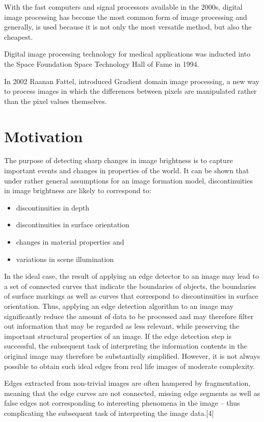 \documentclass[BTech]{srmuthesis}
\begin{document}
With the fast computers and signal processors available in the 2000s, digital image processing has become the most common form of image processing and generally, is used because it is not only the most versatile method, but also the cheapest.

Digital image processing technology for medical applications was inducted into the Space Foundation Space Technology Hall of Fame in 1994.

In 2002 Raanan Fattel, introduced Gradient domain image processing, a new way to process images in which the differences between pixels are manipulated rather than the pixel values themselves.

\section{Motivation}

The purpose of detecting sharp changes in image brightness is to capture important events and changes in properties of the world. It can be shown that under rather general assumptions for an image formation model, discontinuities in image brightness are likely to correspond to:

\begin{itemize}
    \item discontinuities in depth
    \item discontinuities in surface orientation
    \item changes in material properties and
    \item variations in scene illumination
\end{itemize}


In the ideal case, the result of applying an edge detector to an image may lead to a set of connected curves that indicate the boundaries of objects, the boundaries of surface markings as well as curves that correspond to discontinuities in surface orientation. Thus, applying an edge detection algorithm to an image may significantly reduce the amount of data to be processed and may therefore filter out information that may be regarded as less relevant, while preserving the important structural properties of an image. If the edge detection step is successful, the subsequent task of interpreting the information contents in the original image may therefore be substantially simplified. However, it is not always possible to obtain such ideal edges from real life images of moderate complexity.

Edges extracted from non-trivial images are often hampered by fragmentation, meaning that the edge curves are not connected, missing edge segments as well as false edges not corresponding to interesting phenomena in the image – thus complicating the subsequent task of interpreting the image data.[4]
\end{document}
